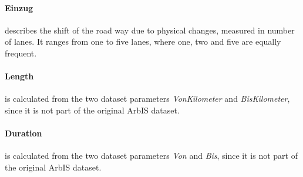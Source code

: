 \paragraph{Einzug} describes the shift of the road way due to physical changes, measured in number of lanes. It ranges from one to five lanes, where one, two and five are equally frequent. 

\paragraph{Length} is calculated from the two dataset parameters \textit{VonKilometer} and \textit{BisKilometer}, since it is not part of the original ArbIS dataset. 

\paragraph{Duration} is calculated from the two dataset parameters \textit{Von} and \textit{Bis}, since it is not part of the original ArbIS dataset.

